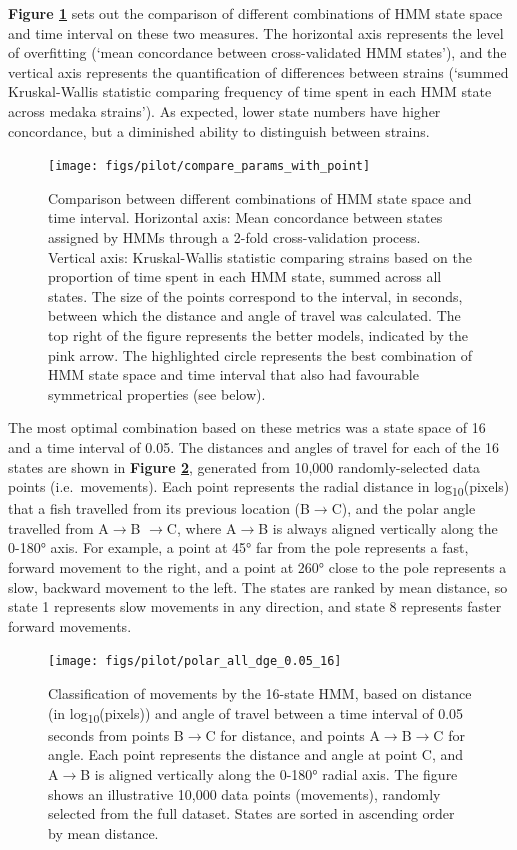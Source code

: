 \documentclass[
]{book}
\begin{document}
\textbf{Figure \ref{fig:compare-params}} sets out the comparison of different combinations of HMM state space and time interval on these two measures. The horizontal axis represents the level of overfitting (`mean concordance between cross-validated HMM states'), and the vertical axis represents the quantification of differences between strains (`summed Kruskal-Wallis statistic comparing frequency of time spent in each HMM state across medaka strains'). As expected, lower state numbers have higher concordance, but a diminished ability to distinguish between strains.



\begin{figure}
\texttt{[image: figs/pilot/compare\_params\_with\_point]} \caption{Comparison between different combinations of HMM state space and time interval. Horizontal axis: Mean concordance between states assigned by HMMs through a 2-fold cross-validation process. Vertical axis: Kruskal-Wallis statistic comparing strains based on the proportion of time spent in each HMM state, summed across all states. The size of the points correspond to the interval, in seconds, between which the distance and angle of travel was calculated. The top right of the figure represents the better models, indicated by the pink arrow. The highlighted circle represents the best combination of HMM state space and time interval that also had favourable symmetrical properties (see below).}\label{fig:compare-params}
\end{figure}

The most optimal combination based on these metrics was a state space of 16 and a time interval of 0.05. The distances and angles of travel for each of the 16 states are shown in \textbf{Figure \ref{fig:pilot-polar-asym}}, generated from 10,000 randomly-selected data points (i.e.~movements). Each point represents the radial distance in log\textsubscript{10}(pixels) that a fish travelled from its previous location (B\(\rightarrow\)C), and the polar angle travelled from A\(\rightarrow\)B \(\rightarrow\)C, where A\(\rightarrow\)B is always aligned vertically along the 0-180° axis. For example, a point at 45° far from the pole represents a fast, forward movement to the right, and a point at 260° close to the pole represents a slow, backward movement to the left. The states are ranked by mean distance, so state 1 represents slow movements in any direction, and state 8 represents faster forward movements.



\begin{figure}
\texttt{[image: figs/pilot/polar\_all\_dge\_0.05\_16]} \caption{Classification of movements by the 16-state HMM, based on distance (in log\textsubscript{10}(pixels)) and angle of travel between a time interval of 0.05 seconds from points B\(\rightarrow\)C for distance, and points A\(\rightarrow\)B\(\rightarrow\)C for angle. Each point represents the distance and angle at point C, and A\(\rightarrow\)B is aligned vertically along the 0-180° radial axis. The figure shows an illustrative 10,000 data points (movements), randomly selected from the full dataset. States are sorted in ascending order by mean distance.}\label{fig:pilot-polar-asym}
\end{figure}
\end{document}
